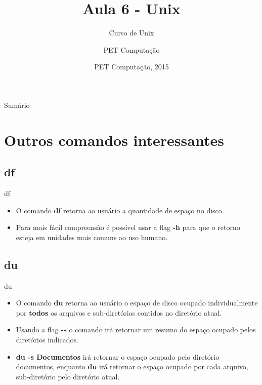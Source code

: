 \documentclass{beamer}
\title{Aula 6 - Unix}
\subtitle{Curso de Unix}
\author{PET Computa\c{c}ão}
\institute[UFSC] %
{
%
  Departamento de Informática e Estatística\\
  Universidade de Santa Catarina}
\date{PET Computa\c{c}ão, 2015}
\begin{document}
\begin{frame}
  \titlepage
\end{frame}

\begin{frame}{Sumário}
  \tableofcontents
\end{frame}

\section{Outros comandos interessantes}

\subsection{df}

\begin{frame}{df}
  \begin{itemize}
  \item {O comando \textbf{df} retorna ao usuário a quantidade de espaço no disco.
  }
  \item{Para mais fácil compreensão é possível usar a flag \textbf{-h} para que o retorno esteja em unidades mais comuns ao uso humano.}
  
  \end{itemize}
\end{frame}

\subsection{du}
\begin{frame}{du}
  \begin{itemize}
  \item { O comando \textbf{du} retorna ao usuário o espaço de disco ocupado individualmente por \textbf{todos} os arquivos e sub-diretórios contidos no diretório atual.}
    \item{Usando a flag \textbf{-s} o comando irá retornar um resumo do espaço ocupado pelos diretórios indicados.
    }
    \item{\textbf{du -s Documentos} irá retornar o espaço ocupado pelo diretório documentos, enquanto \textbf{du} irá retornar o espaço ocupado por cada arquivo, sub-diretório pelo diretório atual.}
    \end{itemize}
\end{frame}
\end{document}
